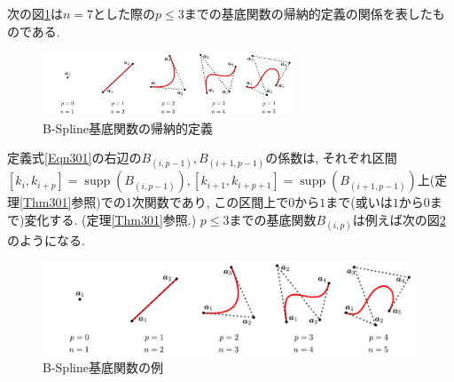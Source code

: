\documentclass{jsarticle}
\newcommand\setR{\mathbb{R}}
\newcommand\squa[1]{[#1]}
\DeclareMathOperator{\supp}{supp}
\theoremstyle{definition}%
\begin{document}
次の図\ref{Fig301}は$n=7$とした際の$p\leq 3$までの基底関数の帰納的定義の関係を表したものである.
\begin{figure}[htbp]
	\centering
    \includegraphics[page=8,clip,width=75mm]{fig.pdf}
	\caption{B-Spline基底関数の帰納的定義}
	\label{Fig301}
\end{figure}

\noindent
定義式\eqref{Eqn301}の右辺の$B_{(i,p-1)},B_{(i+1,p-1)}$の係数は, それぞれ区間$\squa{k_{i},k_{i+p}}=\supp(B_{(i,p-1)}), \squa{k_{i+1},k_{i+p+1}}=\supp(B_{(i+1,p-1)})$上(定理\ref{Thm301}参照)での1次関数であり, この区間上で$0$から$1$まで(或いは$1$から$0$まで)変化する.
(定理\ref{Thm301}参照.)
$p\leq 3$までの基底関数$B_{(i,p)}$は例えば次の図\ref{Fig302}のようになる.
\addtocounter{footnote}{-1}
\begin{figure}[htbp]
	\centering
    \includegraphics[page=9,clip,width=111mm]{fig.pdf}
	\caption{B-Spline基底関数の例\protect\footnotemark}
	\label{Fig302}
\end{figure}
\end{document}
